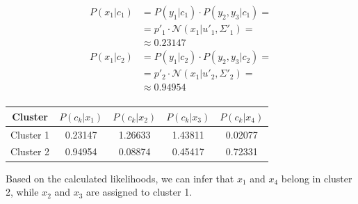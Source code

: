 \documentclass[12pt]{article}
\begin{document}
\begin{enumerate}[leftmargin=\labelsep]
          \begin{equation*}
            \begin{align*}
                P(x_1| c_1) &= P(y_1 | c_1) \cdot P(y_2, y_3 | c_1) = \\
                            &= p'_1 \cdot \mathcal{N}(x_{1} | u'_1, \Sigma'_{1}) = \\
                            & \approx 0.23147 \\
                P(x_1| c_2) &= P(y_1 | c_2) \cdot P(y_2, y_3 | c_2) = \\
                            &= p'_2 \cdot \mathcal{N}(x_{1} | u'_2, \Sigma'_{2}) = \\
                            & \approx 0.94954 \\
            \end{align*}
          \end{equation*}

          \begin{center}
            \captionsetup{type=table}
            \begin{tabular}{c|cccc}
                Cluster & $P(c_k | x_1)$ & $P(c_k | x_2)$& $P(c_k | x_3)$ & $P(c_k | x_4)$                            \\
                \hline
                \colorbox{bmint}{Cluster 1}                                               &
                0.23147                                                                   &
                1.26633                                                                   &
                1.43811                                                                   &
                0.02077                                                                  \\
                \colorbox{byellow}{Cluster 2}                                             &
                0.94954                                                                   &
                0.08874                                                                   &
                0.45417                                                                   &
                0.72331                                                                  \\
            \end{tabular}
          \end{center}

          Based on the calculated likelihoods, we can infer that $x_1$ and $x_4$ belong in cluster 2, while $x_2$ and $x_3$ are assigned to cluster 1.


\end{enumerate}
\end{document}
